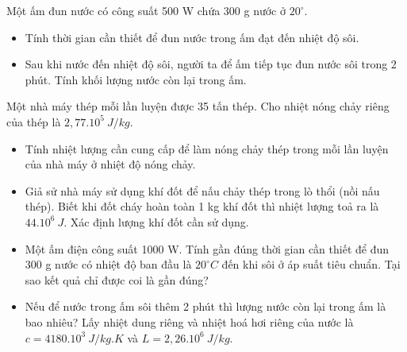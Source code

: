\begin{vidu}
	Một ấm đun nước có công suất 500 W chứa 300 g nước ở $20^\circ$.
	\begin{itemize}
		\item[a)] Tính thời gian cần thiết để đun nước trong ấm đạt đến nhiệt độ sôi.
		\item[b)] Sau khi nước đến nhiệt độ sôi, người ta để ấm tiếp tục đun nước sôi trong 2 phút. Tính khối lượng nước còn lại trong ấm.
	\end{itemize}
	\loigiai{
		\begin{itemize}
			\item 
			\item 
			\item 
			\item 
			\item 
			\item 
		\end{itemize}
	}
\end{vidu}
\begin{vidu}
	Một nhà máy thép mỗi lần luyện được 35 tấn thép. Cho nhiệt nóng chảy riêng của thép là $2,77.10^5\ J/kg$. 
	\begin{itemize}
		\item[a)] Tính nhiệt lượng cần cung cấp để làm nóng chảy thép trong mỗi lần luyện của nhà máy ở nhiệt độ nóng chảy.
		\item[b)] Giả sử nhà máy sử dụng khí đốt để nấu chảy thép trong lò thổi (nồi nấu thép). Biết khi đốt cháy hoàn toàn 1 kg khí đốt thì nhiệt lượng toả ra là $44.10^6\ J$. Xác định lượng khí đốt cần sử dụng.
	\end{itemize}	
	\loigiai{
		\begin{itemize}
			\item 
			\item 
			\item 
			\item 
			\item 
			\item 
		\end{itemize}
	}
\end{vidu}
\begin{vidu}
	\begin{itemize}
		\item[a)] Một ấm điện công suất 1000 W. Tính gần đúng thời gian cần thiết để đun 300 g nước có nhiệt độ ban đầu là $20^\circ C$ đến khi sôi ở áp suất tiêu chuẩn. Tại sao kết quả chỉ được coi là gần đúng?
		\item[b)] Nếu để nước trong ấm sôi thêm 2 phút thì lượng nước còn lại trong ấm là bao nhiêu? Lấy nhiệt dung riêng và nhiệt hoá hơi riêng của nước là $c=4180.10^3\ J/kg.K$ và $L=2,26.10^6\ J/kg$.
	\end{itemize}
	\loigiai{
		\begin{itemize}
			\item 
			\item 
			\item 
			\item 
			\item 
			\item 
		\end{itemize}
	}
\end{vidu}

